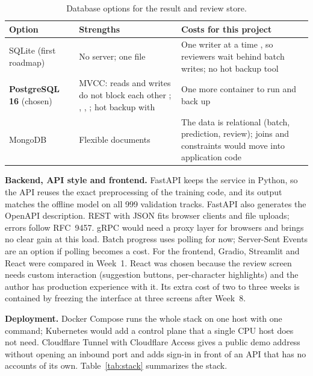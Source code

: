 \begin{table}[tbp]
\centering
\caption{Database options for the result and review store.}
\label{tab:db}
\begin{tabularx}{\textwidth}{@{}P{22mm} L L@{}}
\toprule
Option & Strengths & Costs for this project \\
\midrule
SQLite (first roadmap) & No server; one file & One writer at a time \cite{sqlite_lock}, so reviewers wait behind batch writes; no hot backup tool \\
\textbf{PostgreSQL 16} (chosen) & MVCC: reads and writes do not block each other \cite{postgres_mvcc}; , , ; hot backup with  & One more container to run and back up \\
MongoDB & Flexible documents & The data is relational (batch, prediction, review); joins and constraints would move into application code \\
\bottomrule
\end{tabularx}
\end{table}

\textbf{Backend, API style and frontend.} FastAPI \cite{fastapi} keeps the service in Python, so the
API reuses the exact preprocessing of the training code, and its output matches the offline model on
all 999 validation tracks. FastAPI also generates the OpenAPI description. REST with JSON fits
browser clients and file uploads; errors follow RFC~9457. gRPC would need a proxy layer for browsers
and brings no clear gain at this load. Batch progress uses polling for now; Server-Sent Events are an option if
polling becomes a cost. For the frontend, Gradio, Streamlit and React were compared in
Week~1. React was chosen because the review screen needs custom interaction (suggestion buttons,
per-character highlights) and the author has production experience with it. Its extra cost of two to
three weeks is contained by freezing the interface at three screens after Week~8.

\textbf{Deployment.} Docker Compose runs the whole stack on one host with one command; Kubernetes
would add a control plane that a single CPU host does not need. Cloudflare Tunnel with Cloudflare
Access gives a public demo address without opening an inbound port and adds
sign-in in front of an API that has no accounts of its own. Table~\ref{tab:stack} summarizes the
stack.

